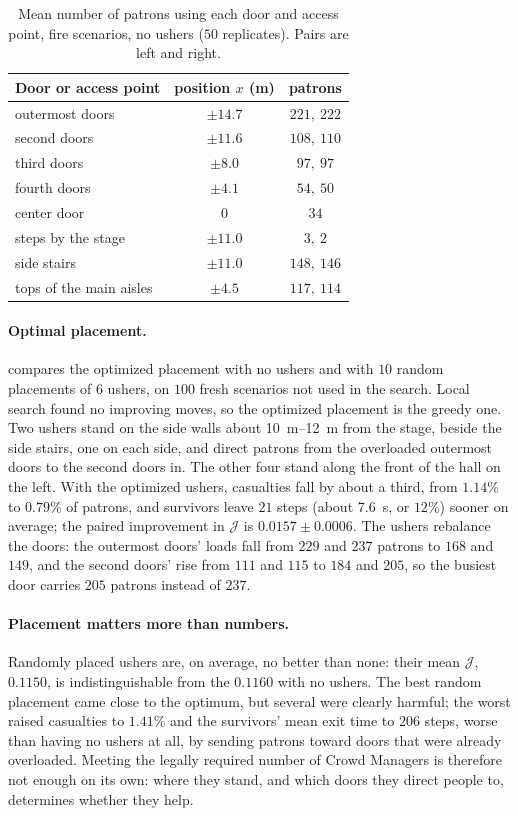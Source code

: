 \documentclass[14pt]{article}
\theoremstyle{definition}
\begin{document}
\begin{table}[H]
  \centering
  \caption{Mean number of patrons using each door and access point, fire scenarios,
  no ushers ($50$ replicates). Pairs are left and right.}
  \label{tab:door_loads}
  \begin{tabular}{lcc}
    \toprule
    Door or access point & position $x$ (\si{m}) & patrons \\
    \midrule
    outermost doors & $\pm 14.7$ & $221,\ 222$ \\
    second doors & $\pm 11.6$ & $108,\ 110$ \\
    third doors & $\pm 8.0$ & $97,\ 97$ \\
    fourth doors & $\pm 4.1$ & $54,\ 50$ \\
    center door & $0$ & $34$ \\
    \midrule
    steps by the stage & $\pm 11.0$ & $3,\ 2$ \\
    side stairs & $\pm 11.0$ & $148,\ 146$ \\
    tops of the main aisles & $\pm 4.5$ & $117,\ 114$ \\
    \bottomrule
  \end{tabular}
\end{table}

\paragraph{Optimal placement.}  compares the optimized placement with
no ushers and with $10$ random placements of $6$ ushers, on $100$ fresh scenarios not
used in the search. Local search found no improving moves, so the optimized placement is
the greedy one. Two ushers stand on the side walls about \SIrange{10}{12}{m} from the
stage, beside the side stairs, one on each side, and direct patrons from the overloaded
outermost doors to the second doors in. The other four stand along the front of the
hall on the left. With the optimized ushers, casualties fall by about a third, from
$1.14\%$ to $0.79\%$ of patrons, and survivors leave $21$ steps (about \SI{7.6}{s}, or
$12\%$) sooner on average; the paired improvement in $\mathcal{J}$ is
$0.0157 \pm 0.0006$. The ushers rebalance the doors: the outermost doors' loads fall from
$229$ and $237$ patrons to $168$ and $149$, and the second doors' rise from $111$ and $115$
to $184$ and $205$, so the busiest door carries $205$ patrons instead of $237$.

\paragraph{Placement matters more than numbers.} Randomly placed ushers are, on average,
no better than none: their mean $\mathcal{J}$, $0.1150$, is indistinguishable from the
$0.1160$ with no ushers. The best random placement came close to the optimum, but several
were clearly harmful; the worst raised casualties to $1.41\%$ and the survivors' mean exit
time to $206$ steps, worse than having no ushers at all, by sending patrons toward doors
that were already overloaded. Meeting the legally required number of Crowd Managers is
therefore not enough on its own: where they stand, and which doors they direct people
to, determines whether they help.
\end{document}
